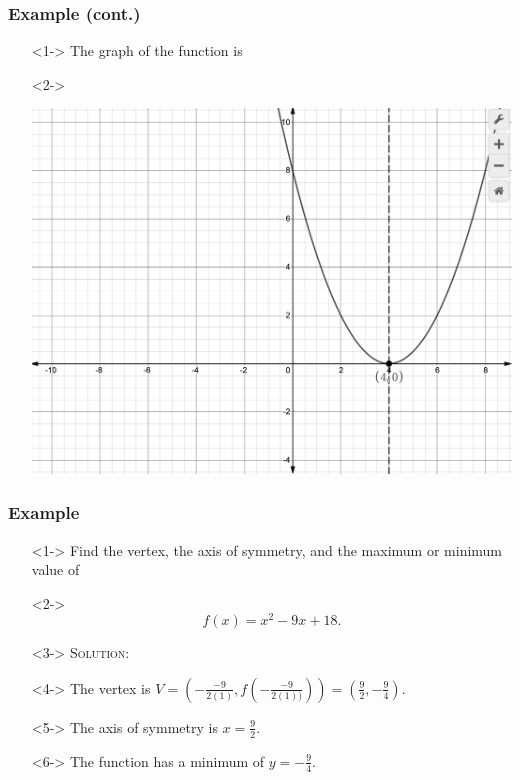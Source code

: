 \documentclass[handout]{beamer}
\begin{document}
\begin{frame}
	\frametitle{Example (cont.)} 
	\begin{enumerate}
		\item[]<1-> The graph of the function is 
		\item[]<2->\begin{center}
				\includegraphics[scale=0.25]{3_3_4.png} 		
			\end{center} 
	\end{enumerate}
\end{frame}

\begin{frame}
	\frametitle{Example} 
	\begin{enumerate}
		\item[]<1-> Find the vertex, the axis of symmetry, and the maximum or minimum value of 
		\item[]<2->\[ f(x)=x^{2}-9x+18. \] 
		\item[]<3-> \textsc{Solution:} 
		\item[]<4-> The vertex is $V=\left( -\frac{-9}{2(1)}, f \left( -\frac{-9}{2(1))} \right)\right)=\left( \frac{9}{2}, -\frac{9}{4}\right)$. 
		\item[]<5-> The axis of symmetry is $x=\frac{9}{2}$. 
		\item[]<6-> The function has a minimum of $y=-\frac{9}{4}$.  
	\end{enumerate}
\end{frame}
\end{document}
